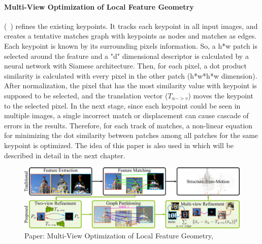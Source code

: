 \documentclass[11pt]{article}
\begin{document}
    \paragraph{Multi-View Optimization of Local Feature Geometry} (~\cite{Dusmanu2020Multi}) refines the existing keypoints. It tracks each keypoint in all input images, and creates a tentative
    matches graph with keypoints as nodes and matches as edges. Each keypoint is known by its surrounding pixels
    information. So, a h*w patch is selected around the feature and a "d" dimensional descriptor is calculated by
    a neural network with Siamese architecture. Then, for each pixel, a dot product similarity is calculated
    with every pixel in the other patch (h*w*h*w dimension). After normalization, the pixel that has the most
    similarity value with keypoint is supposed to be selected, and the translation vector ($T_{u->v}$)
    moves the keypoint to the selected pixel. In the next stage, since each keypoint could be seen in multiple images,
    a single incorrect match or displacement can cause cascade of errors in the results. Therefore, for each track of
    matches, a non-linear equation for minimizing the dot similarity between patches among all patches for the same
    keypoint is optimized. The idea of this paper is also used in \cite{lindenberger2021pixsfm} which will be
    described in detail in the next chapter.

    \begin{figure}
    \centering
    \includegraphics[width=\textwidth,height=\textheight,keepaspectratio]{images/dusmano.jpg}
    \caption{Paper: Multi-View Optimization of Local Feature Geometry, \cite{Dusmanu2020Multi}}
    \end{figure}
\end{document}

